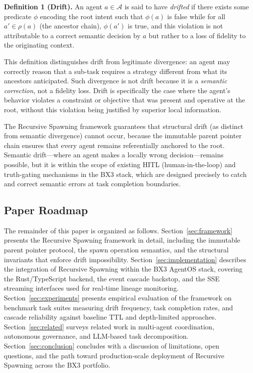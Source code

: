 \textbf{Definition 1 (Drift).} An agent $a \in \mathcal{A}$ is said to have \textit{drifted} if there exists some predicate $\phi$ encoding the root intent such that $\phi(a)$ is false while for all $a' \in \rho(a)$ (the ancestor chain), $\phi(a')$ is true, and this violation is not attributable to a correct semantic decision by $a$ but rather to a loss of fidelity to the originating context.

This definition distinguishes drift from legitimate divergence: an agent may correctly reason that a sub-task requires a strategy different from what its ancestors anticipated. Such divergence is not drift because it is a \textit{semantic correction}, not a fidelity loss. Drift is specifically the case where the agent's behavior violates a constraint or objective that was present and operative at the root, without this violation being justified by superior local information.

The Recursive Spawning framework guarantees that structural drift (as distinct from semantic divergence) cannot occur, because the immutable parent pointer chain ensures that every agent remains referentially anchored to the root. Semantic drift—where an agent makes a locally wrong decision—remains possible, but it is within the scope of existing HITL (human-in-the-loop) and truth-gating mechanisms in the BX3 stack, which are designed precisely to catch and correct semantic errors at task completion boundaries.

\subsection{Paper Roadmap}

The remainder of this paper is organized as follows. Section~\ref{sec:framework} presents the Recursive Spawning framework in detail, including the immutable parent pointer protocol, the spawn operation semantics, and the structural invariants that enforce drift impossibility. Section~\ref{sec:implementation} describes the integration of Recursive Spawning within the BX3 AgentOS stack, covering the Rust/TypeScript backend, the event cascade backstop, and the SSE streaming interfaces used for real-time lineage monitoring. Section~\ref{sec:experiments} presents empirical evaluation of the framework on benchmark task suites measuring drift frequency, task completion rates, and cascade reliability against baseline TTL and depth-limited approaches. Section~\ref{sec:related} surveys related work in multi-agent coordination, autonomous governance, and LLM-based task decomposition. Section~\ref{sec:conclusion} concludes with a discussion of limitations, open questions, and the path toward production-scale deployment of Recursive Spawning across the BX3 portfolio.
